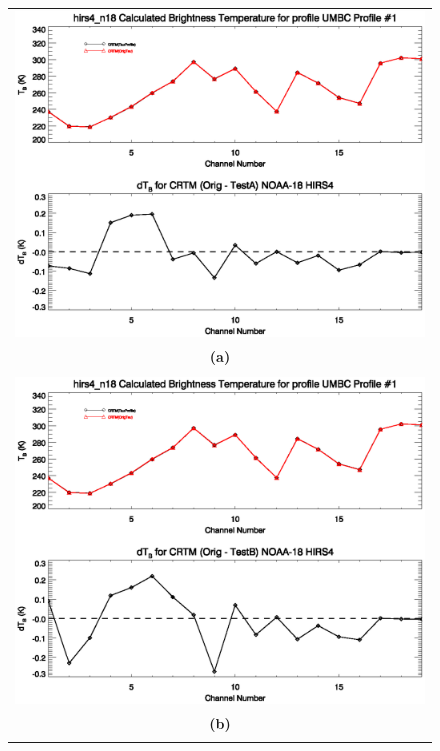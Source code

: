\begin{figure}[htp]
  \centering{}
  \begin{tabular}{c}
    \includegraphics[bb=80 249 572 395,clip,scale=0.8]{./graphics/LBLRTM_TA.eps}\\
    {\sffamily\textbf{(a)}}\\\\
    \includegraphics[bb=80 249 572 395,clip,scale=0.8]{./graphics/LBLRTM_TB.eps}\\
    {\sffamily\textbf{(b)}}\\\\

\end{tabular}
\end{figure}
